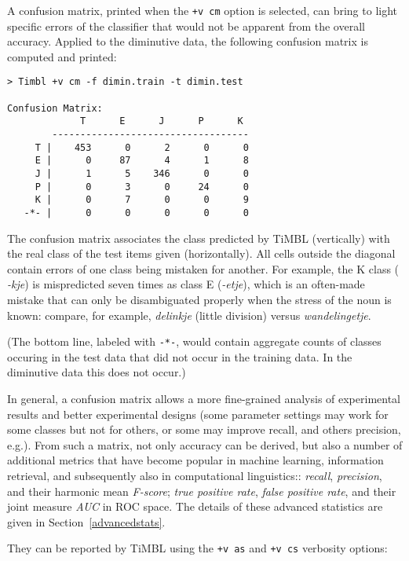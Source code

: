 \documentclass{report}
\begin{document}
A confusion matrix, printed when the {\tt +v cm} option is selected,
can bring to light specific errors of the classifier that would not be
apparent from the overall accuracy. Applied to the diminutive data,
the following confusion matrix is computed and printed:

{\footnotesize
\begin{verbatim}
> Timbl +v cm -f dimin.train -t dimin.test

Confusion Matrix:
             T      E      J      P      K 
        -----------------------------------
     T |    453      0      2      0      0 
     E |      0     87      4      1      8 
     J |      1      5    346      0      0 
     P |      0      3      0     24      0 
     K |      0      7      0      0      9 
   -*- |      0      0      0      0      0 
\end{verbatim}
}

The confusion matrix associates the class predicted by TiMBL
(vertically) with the real class of the test items given
(horizontally). All cells outside the diagonal contain errors of one
class being mistaken for another. For example, the K class ({\em
  -kje}) is mispredicted seven times as class E ({\em -etje}), which
is an often-made mistake that can only be disambiguated properly when
the stress of the noun is known: compare, for example, {\em delinkje}
(little division) versus {\em wandelingetje}.

(The bottom line, labeled with {\tt -*-}, would contain aggregate
counts of classes occuring in the test data that did not occur in the
training data. In the diminutive data this does not occur.)

In general, a confusion matrix allows a more fine-grained analysis of
experimental results and better experimental designs (some parameter
settings may work for some classes but not for others, or some may
improve recall, and others precision, e.g.). From such a matrix, not
only accuracy can be derived, but also a number of additional metrics
that have become popular in machine learning, information retrieval,
and subsequently also in computational linguistics:: {\em recall},
{\em precision}, and their harmonic mean {\em F-score}; {\em true
  positive rate}, {\em false positive rate}, and their joint measure
{\em AUC} in ROC space.  The details of these advanced statistics are
given in Section~\ref{advancedstats}.

They can be reported by TiMBL using the {\tt +v as} and {\tt +v cs}
verbosity options:
\end{document}
